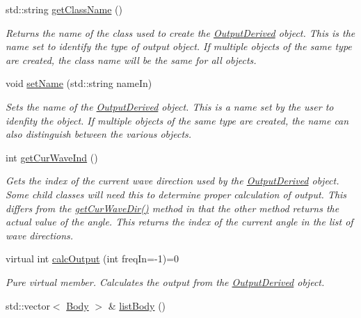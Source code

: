 \begin{DoxyCompactItemize}
std\-::string \hyperlink{classosea_1_1ofreq_1_1_output_derived_a448d6b59b506132ba2514ea6db7a1578}{get\-Class\-Name} ()
\begin{DoxyCompactList}\small\item\em Returns the name of the class used to create the \hyperlink{classosea_1_1ofreq_1_1_output_derived}{Output\-Derived} object. This is the name set to identify the type of output object. If multiple objects of the same type are created, the class name will be the same for all objects. \end{DoxyCompactList}\item 
void \hyperlink{classosea_1_1ofreq_1_1_output_derived_ac4db0b795c3bbb79072bce39e78b4d44}{set\-Name} (std\-::string name\-In)
\begin{DoxyCompactList}\small\item\em Sets the name of the \hyperlink{classosea_1_1ofreq_1_1_output_derived}{Output\-Derived} object. This is a name set by the user to idenfity the object. If multiple objects of the same type are created, the name can also distinguish between the various objects. \end{DoxyCompactList}\item 
int \hyperlink{classosea_1_1ofreq_1_1_output_derived_ad4bb95c9693b2f34a40eb0136f2a13f4}{get\-Cur\-Wave\-Ind} ()
\begin{DoxyCompactList}\small\item\em Gets the index of the current wave direction used by the \hyperlink{classosea_1_1ofreq_1_1_output_derived}{Output\-Derived} object. Some child classes will need this to determine proper calculation of output. This differs from the \hyperlink{classosea_1_1ofreq_1_1_output_derived_a4bc65913a6296429faf034aa4597ade2}{get\-Cur\-Wave\-Dir()} method in that the other method returns the actual value of the angle. This returns the index of the current angle in the list of wave directions. \end{DoxyCompactList}\item 
virtual int \hyperlink{classosea_1_1ofreq_1_1_output_derived_a0958c43739fc778d0141e806dafbf46c}{calc\-Output} (int freq\-In=-\/1)=0
\begin{DoxyCompactList}\small\item\em Pure virtual member. Calculates the output from the \hyperlink{classosea_1_1ofreq_1_1_output_derived}{Output\-Derived} object. \end{DoxyCompactList}\item 
std\-::vector$<$ \hyperlink{classosea_1_1ofreq_1_1_body}{Body} $>$ \& \hyperlink{classosea_1_1ofreq_1_1_output_derived_a525d8eb4dbed1fd130614521c5d602c1}{list\-Body} ()

\end{DoxyCompactItemize}
